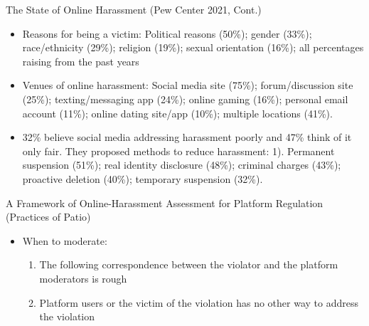 \documentclass[nobackground,dvipsnames,table]{beamer}
\begin{document}
\begin{frame}{The State of Online Harassment 
(Pew Center 2021, Cont.)}

\begin{itemize}
    \item Reasons for being a victim: Political reasons (50\%); gender (33\%); race/ethnicity (29\%); religion (19\%); sexual orientation (16\%); all percentages raising from the past years
    \item Venues of online harassment: Social media site (75\%); forum/discussion site (25\%); texting/messaging app (24\%); online gaming (16\%); personal email account (11\%); online dating site/app (10\%); multiple locations (41\%).
    \item 32\% believe social media addressing harassment poorly and 47\% think of it only fair. They proposed methods to reduce harassment: 1). Permanent suspension (51\%); real identity disclosure (48\%); criminal charges (43\%); proactive deletion (40\%); temporary suspension (32\%).
\end{itemize}
\end{frame}



\begin{frame}{A Framework of Online-Harassment Assessment for Platform Regulation (Practices of Patio)}

\begin{itemize}
    \item When to moderate:
    \begin{enumerate}
        \item The following correspondence between the violator and the platform moderators is rough
        \item Platform users or the victim of the violation has no other way to address the violation   
    \end{enumerate}
\end{itemize}

\end{frame}
\end{document}
